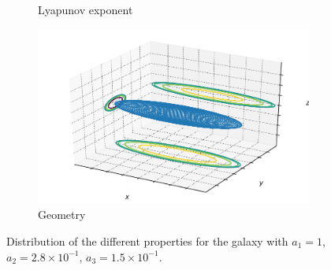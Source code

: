 \begin{figure}[h]
\begin{subfigure}[t]{0.4\textwidth}
        \caption{Lyapunov exponent}
    \end{subfigure}
    \begin{subfigure}[t]{0.4\textwidth}
        \includegraphics[width=\textwidth]{"../Files/Week 13/images/14_ellipsoid"}
        \caption{Geometry}
    \end{subfigure}
    \caption{Distribution of the different properties for the galaxy with $a_1 = 1$, $a_2 = 2.8\times10^{-1}$, $a_3 = 1.5\times10^{-1}$.}
\end{figure}


